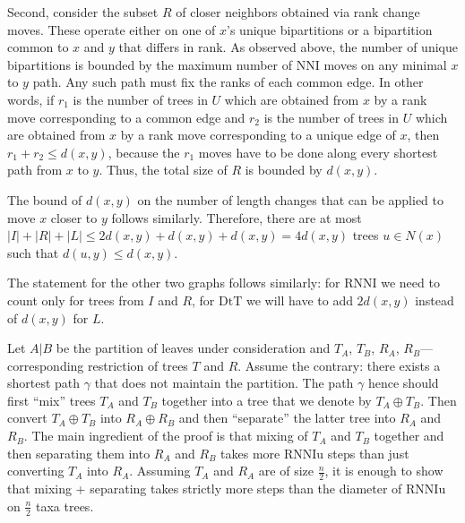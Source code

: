 \documentclass[11pt]{amsart}
\theoremstyle{definition}
\newcommand{\nni}{\mathrm{NNI}}
\newcommand{\rnni}{\mathrm{RNNI}}
\newcommand{\rnniu}{\mathrm{RNNIu}}
\newcommand{\dtt}{\mathrm{DtT}}
\begin{document}
Second, consider the subset $R$ of closer neighbors obtained via rank change moves.
These operate either on one of $x$'s unique bipartitions or a bipartition common to $x$ and $y$ that differs in rank.
As observed above, the number of unique bipartitions is bounded by the maximum number of $\nni$ moves on any minimal $x$ to $y$ path.
Any such path must fix the ranks of each common edge.
In other words, if $r_1$ is the number of trees in $U$ which are obtained from $x$ by a rank move corresponding to a common edge and $r_2$ is the number of trees in $U$ which are obtained from $x$ by a rank move corresponding to a unique edge of $x$, then $r_1 + r_2 \leq d(x,y)$, because the $r_1$ moves have to be done along every shortest path from $x$ to $y$.
Thus, the total size of $R$ is bounded by $d(x,y)$.

The bound of $d(x,y)$ on the number of length changes that can be applied to move $x$ closer to $y$ follows similarly.
Therefore, there are at most $|I| + |R| + |L| \le 2d(x,y) + d(x,y) + d(x,y) = 4d(x,y)$ trees $u \in N(x)$ such that $d(u, y) \le d(x, y)$.

The statement for the other two graphs follows similarly: for $\rnni$ we need to count only for trees from $I$ and $R$, for $\dtt$ we will have to add $2d(x,y)$ instead of $d(x,y)$ for $L$.
\endproof

\bigskip


Let $A|B$ be the partition of leaves under consideration and $T_A$, $T_B$, $R_A$, $R_B$---corresponding restriction of trees $T$ and $R$.
Assume the contrary: there exists a shortest path $\gamma$ that does not maintain the partition.
The path $\gamma$ hence should first ``mix'' trees $T_A$ and $T_B$ together into a tree that we denote by $T_A \oplus T_B$.
Then convert $T_A \oplus T_B$ into $R_A \oplus R_B$ and then ``separate'' the latter tree into $R_A$ and $R_B$.
The main ingredient of the proof is that mixing of $T_A$ and $T_B$ together and then separating them into $R_A$ and $R_B$ takes more $\rnniu$ steps than just converting $T_A$ into $R_A$.
Assuming $T_A$ and $R_A$ are of size $\frac n2$, it is enough to show that mixing + separating takes strictly more steps than the diameter of $\rnniu$ on $\frac n2$ taxa trees.

\newpage


\printbibliography
\end{document}
